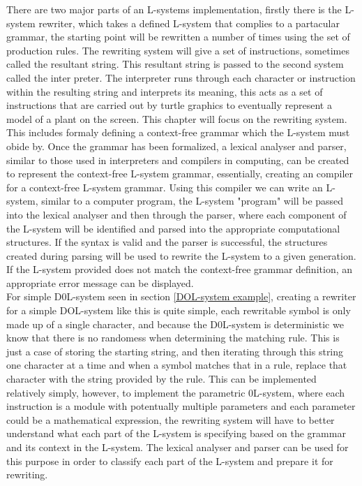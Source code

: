 

\lettrine[lines=3]{T}{}here are two major parts of an L-systems implementation, firstly there is the L-system rewriter, which takes a defined L-system that complies to a partacular grammar, the starting point will be rewritten a number of times using the set of production rules. The rewriting system will give a set of instructions, sometimes called the resultant string. This resultant string is passed to the second system called the inter
preter. The interpreter runs through each character or instruction within the resulting string  and interprets its meaning, this acts as a set of instructions that are carried out by turtle graphics to eventually represent a model of a plant on the screen. This chapter will focus on the rewriting system. This includes formaly defining a context-free grammar which the L-system must obide by. Once the grammar has been formalized, a lexical analyser and parser, similar to those used in interpreters and compilers in computing, can be created to represent the context-free L-system grammar, essentially, creating an compiler for a context-free L-system grammar. Using this compiler we can write an L-system, similar to a computer program, the L-system "program" will be passed into the lexical analyser and then through the parser, where each component of the L-system will be identified and parsed into the appropriate computational structures. If the syntax is valid and the parser is successful, the structures created during parsing will be used to rewrite the L-system to a given generation. If the L-system provided does not match the context-free grammar definition, an appropriate error message can be displayed. \\

For simple D0L-system seen in section \ref{DOL-system example}, creating a rewriter for a simple DOL-system like this is quite simple, each rewritable symbol is only made up of a single character, and because the D0L-system is deterministic we know that there is no randomess when determining the matching rule. This is just a case of storing the starting string, and then iterating through this string one character at a time and when a symbol matches that in a rule, replace that character with the string provided by the rule. This can be implemented relatively simply, however, to implement the parametric 0L-system, where each instruction is a module with potentually multiple parameters and each parameter could be a mathematical expression, the rewriting system will have to better understand what each part of the L-system is specifying based on the grammar and its context in the L-system. The lexical analyser and parser can be used for this purpose in order to classify each part of the L-system and prepare it for rewriting. \\

